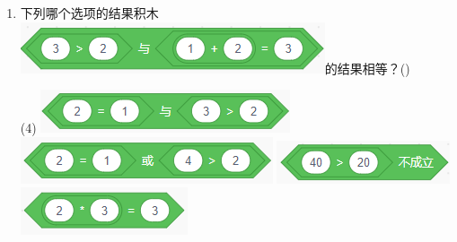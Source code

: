\documentclass[10pt, a4paper]{article}
\newcommand{\hq}{\hfill(\qquad)}
\begin{document}
\begin{enumerate}
        \item 下列哪个选项的结果积木\includegraphics[width=.2\textwidth]{figure/17.png}的结果相等？\hq
        \begin{tasks}(4)
            \task \includegraphics[width=.18\textwidth]{figure/17a.png}
            \task \includegraphics[width=.18\textwidth]{figure/17b.png}
            \task \includegraphics[width=.15\textwidth]{figure/17c.png}
            \task \includegraphics[width=.15\textwidth]{figure/17d.png}
        \end{tasks}


\end{enumerate}
\end{document}
